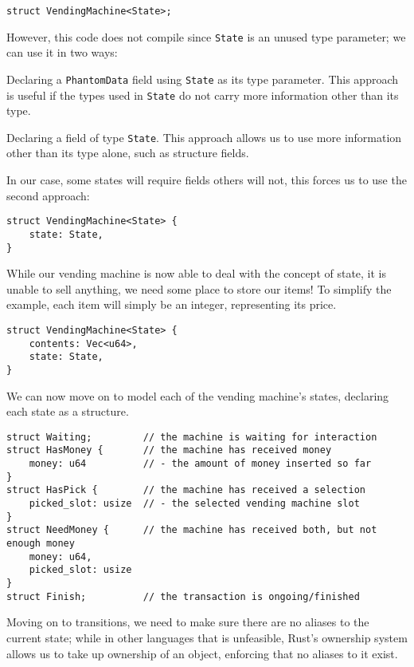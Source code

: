 \begin{verbatim}
struct VendingMachine<State>;
\end{verbatim}

However, this code does not compile since \texttt{State} is an unused type parameter;
we can use it in two ways:
\begin{compactitem}
    \item Declaring a \texttt{PhantomData} field using \texttt{State} as its type parameter.
    This approach is useful if the types used in \texttt{State} do not carry more information other than its type.
    \item Declaring a field of type \texttt{State}.
    This approach allows us to use more information other than its type alone, such as structure fields.
\end{compactitem}

In our case, some states will require fields others will not,
this forces us to use the second approach:

\begin{verbatim}
struct VendingMachine<State> {
    state: State,
}
\end{verbatim}

While our vending machine is now able to deal with the concept of state,
it is unable to sell anything, we need some place to store our items!
To simplify the example, each item will simply be an integer, representing its price.

\begin{verbatim}
struct VendingMachine<State> {
    contents: Vec<u64>,
    state: State,
}
\end{verbatim}

We can now move on to model each of the vending machine's states,
declaring each state as a structure.

\begin{verbatim}
struct Waiting;         // the machine is waiting for interaction
struct HasMoney {       // the machine has received money
    money: u64          // - the amount of money inserted so far
}
struct HasPick {        // the machine has received a selection
    picked_slot: usize  // - the selected vending machine slot
}
struct NeedMoney {      // the machine has received both, but not enough money
    money: u64,
    picked_slot: usize
}
struct Finish;          // the transaction is ongoing/finished
\end{verbatim}

Moving on to transitions, we need to make sure there are no aliases to the current state;
while in other languages that is unfeasible, Rust's ownership system allows us to take up ownership of an object,
enforcing that no aliases to it exist.


